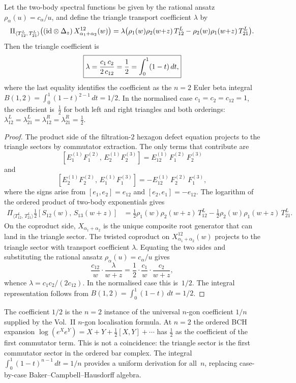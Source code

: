 \begin{theorem}
\label{thm:sl3-triangle-coefficient}
Let the two-body spectral functions be given by the rational ansatz
$\rho_{\alpha}(u)=c_\alpha/u$, and define the triangle transport
coefficient $\lambda$ by
\[
\Pi_{\langle T^L_{12},\,T^L_{21}\rangle}
\big((\mathrm{id}\otimes\Delta_z)\,X_{\alpha_1+\alpha_2}^{12}(w)\big)
=
\lambda\big(\rho_1(w)\rho_2(w{+}z)\,T^L_{12}
-\rho_2(w)\rho_1(w{+}z)\,T^L_{21}\big).
\]
Then the triangle coefficient is
\[
\boxed{%
\lambda
=
\frac{c_1\,c_2}{2\,c_{12}}
=
\frac{1}{2}
=
\int_0^1(1-t)\,dt,
}
\]
where the last equality identifies the coefficient as the $n=2$ Euler
beta integral $B(1,2)=\int_0^1(1-t)^{2-1}\,dt=1/2$.
In the normalised case $c_1=c_2=c_{12}=1$, the coefficient is~$\frac12$
for both left and right triangles and both orderings:
$\lambda^L_{12}=\lambda^L_{21}=\lambda^R_{12}=\lambda^R_{21}=\frac12$.
\end{theorem}

\begin{proof}
The product side of the filtration-$2$ hexagon defect equation projects
to the triangle sectors by commutator extraction. The only terms that
contribute are
\[
[E_1^{(1)}F_1^{(2)},\,E_2^{(1)}F_2^{(3)}]
=E_{12}^{(1)}\,F_1^{(2)}\,F_2^{(3)}
\]
and
\[
[E_2^{(1)}F_2^{(2)},\,E_1^{(1)}F_1^{(3)}]
=-E_{12}^{(1)}\,F_2^{(2)}\,F_1^{(3)},
\]
where the signs arise from
$[e_1,e_2]=e_{12}$ and $[e_2,e_1]=-e_{12}$.
The logarithm of the ordered product of two-body exponentials gives
\begin{align*}
\Pi_{\langle T^L_{12},\,T^L_{21}\rangle}
\tfrac{1}{2}[S_{12}(w),\,S_{13}(w{+}z)]
&=
\tfrac{1}{2}\rho_1(w)\rho_2(w{+}z)\,T^L_{12}
-\tfrac{1}{2}\rho_2(w)\rho_1(w{+}z)\,T^L_{21}.
\end{align*}
On the coproduct side, $X_{\alpha_1+\alpha_2}$ is the unique composite
root generator that can land in the triangle sector. The twisted
coproduct on $X_{\alpha_1+\alpha_2}^{12}(w)$ projects to the triangle
sector with transport coefficient $\lambda$. Equating the two sides and
substituting the rational ansatz $\rho_\alpha(u)=c_\alpha/u$ gives
\[
\frac{c_{12}}{w}\cdot\frac{\lambda}{w+z}
=
\frac{1}{2}\cdot\frac{c_1}{w}\cdot\frac{c_2}{w+z},
\]
whence $\lambda=c_1 c_2/(2c_{12})$. In the normalised case this
is~$1/2$. The integral representation follows from
$B(1,2)=\int_0^1(1-t)\,dt=1/2$.
\end{proof}

\begin{remark}
\label{rem:triangle-as-bch}
The coefficient $1/2$ is the $n=2$ instance of the universal $n$-gon
coefficient $1/n$ supplied by the Vol.~II $n$-gon localisation formula.
At $n=2$ the ordered BCH expansion
$\log(e^X e^Y)=X+Y+\frac12[X,Y]+\cdots$
has $\frac12$ as the coefficient of the first commutator term. This is
not a coincidence: the triangle sector is the first commutator sector
in the ordered bar complex. The integral $\int_0^1(1-t)^{n-1}\,dt=1/n$
provides a uniform derivation for all~$n$, replacing case-by-case
Baker--Campbell--Hausdorff algebra.
\end{remark}

